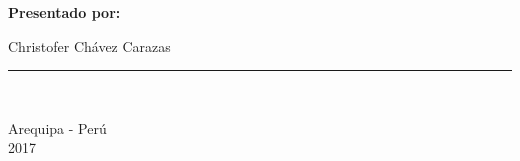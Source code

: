 \begin{titlepage}
\begin{center}
\vspace{8mm}

\begin{large}
\textbf{Presentado por:}\\

\begin{flushleft}

\hspace{7cm} Christofer Chávez Carazas \\

\end{flushleft}
\end{large}
\vspace{4cm}
\rule{80mm}{0.1mm}\\
\vspace*{0.1in}

\begin{large}
Arequipa - Perú \\
2017 \\
\end{large}
\end{center}
\end{titlepage}

  